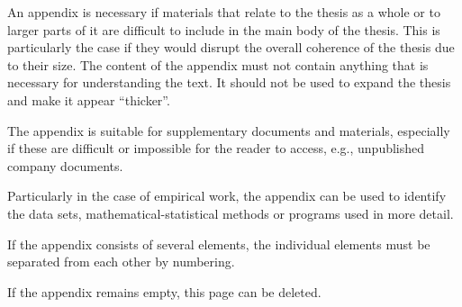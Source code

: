 An appendix is necessary if materials that relate to the thesis as a whole or to larger parts of it are difficult to include in the main body of the thesis. This is particularly the case if they would disrupt the overall coherence of the thesis due to their size. The content of the appendix must not contain anything that is necessary for understanding the text. It should not be used to expand the thesis and make it appear “thicker”.

The appendix is suitable for supplementary documents and materials, especially if these are difficult or impossible for the reader to access, e.g., unpublished company documents.

Particularly in the case of empirical work, the appendix can be used to identify the data sets, mathematical-statistical methods or programs used in more detail. 

If the appendix consists of several elements, the individual elements must be separated from each other by numbering.

If the appendix remains empty, this page can be deleted.
